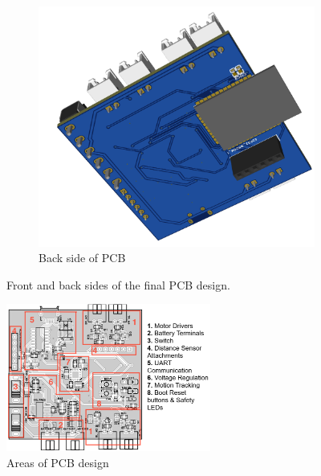 \begin{figure}[H]
\begin{subfigure}[b]{0.48\textwidth}
        \includegraphics[width=\textwidth]{img/final-pcb-back.png}
        \caption{Back side of PCB}
        \label{fig:pcb-back}
    \end{subfigure}
    \caption{Front and back sides of the final PCB design.}
    \label{fig:pcb-final}
\end{figure}


\begin{figure}[H]
    \centering
    \captionsetup{justification=centering, margin=1cm}
    \includegraphics[width=0.6\textwidth]{img/pcb-sections3.PNG}
    \caption{Areas of PCB design}
    \label{fig:pcb-sections}
\end{figure}

